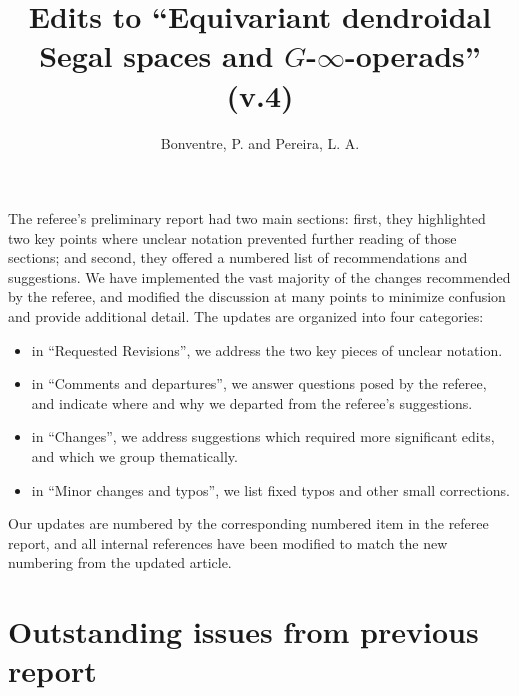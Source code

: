 \documentclass{article}
\begin{document}
 
 
\title{Edits to ``Equivariant dendroidal Segal spaces and $G$-$\infty$-operads'' (v.4)
\\[12pt]} %
 
\author{Bonventre, P. and Pereira, L. A.}
 
\maketitle
 
The referee's preliminary report had two main sections:
first, they highlighted two key points where unclear notation prevented further reading of those sections; %
and second, they offered a numbered list of recommendations and suggestions.
We have implemented the vast majority of the changes recommended by the referee, and modified the discussion at many points to minimize confusion and provide additional detail.
The updates are organized into four categories:
\begin{itemize}
\item in ``Requested Revisions'', we address the two key pieces of unclear notation.
\item in ``Comments and departures'', we answer questions posed by the referee, and indicate where and why we departed from the referee's suggestions.
\item in ``Changes'', we address suggestions which required more significant edits,
and which we group thematically.
\item in ``Minor changes and typos'', we list fixed typos and other small corrections. %
\end{itemize}

Our updates are numbered by the corresponding numbered item in the referee report,
and all internal references have been modified to match the new numbering from the updated article.






\section{Outstanding issues from previous report}
\end{document}
